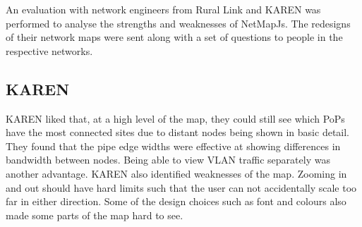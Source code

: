 \documentclass[11pt, a4paper]{article}
\begin{document}



An evaluation with network engineers from Rural Link and KAREN was performed to
analyse the strengths and weaknesses of NetMapJs. The redesigns of their network
maps were sent along with a set of questions to people in the respective
networks.

\subsection{KAREN}

KAREN liked that, at a high level of the map, they could still see which PoPs
have the most connected sites due to distant nodes being shown in basic detail.
They found that the pipe edge widths were effective at showing differences in
bandwidth between nodes. Being able to view VLAN traffic separately was another
advantage. KAREN also identified weaknesses of the map. Zooming in and out
should have hard limits such that the user can not accidentally scale too far in
either direction. Some of the design choices such as font and colours also made 
some parts of the map hard to see. 
\end{document}
